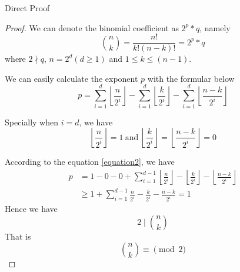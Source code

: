 \item Direct Proof
\begin{proof}
We can denote the binomial coefficient as $2^p * q$, namely
\begin{equation}\label{equation2}
\binom{n}{k} = \frac{n!}{k!(n - k)!} = 2^p * q
\end{equation}
where $2 \nmid q$, $n = 2^d(d \geq 1)$ and $1\leq k\leq (n - 1)$.

We can easily calculate the exponent $p$ with the formular below
\begin{displaymath}
p = \sum_{i = 1}^{d}\left\lfloor \frac{n}{2^i} \right\rfloor - \sum_{i = 1}^{d}\left\lfloor \frac{k}{2^i}\right\rfloor - \sum_{i = 1}^{d}\left\lfloor \frac{n - k}{2^i}\right\rfloor
\end{displaymath}

Specially when $i = d$, we have
\begin{displaymath}
\left\lfloor \frac{n}{2^i} \right\rfloor = 1~\text{and}~\left\lfloor \frac{k}{2^i}\right\rfloor = \left\lfloor \frac{n - k}{2^i}\right\rfloor = 0
\end{displaymath}

According to the equation \eqref{equation2}, we have
\begin{displaymath}
	\begin{split}
		p &= 1 - 0 - 0 + \sum_{i = 1}^{d - 1} \left\lfloor \frac{n}{2^i}\right\rfloor - \left\lfloor \frac{k}{2^i}\right\rfloor - \left\lfloor \frac{n - k}{2^i}\right\rfloor\\
		&\geq 1  + \sum_{i = 1}^{d - 1} \frac{n}{2^i} - \frac{k}{2^i} - \frac{n - k}{2^i} = 1
	\end{split}
\end{displaymath}
Hence we have
\[2 \mid \binom{n}{k}\]
That is
\[\binom{n}{k} \equiv \pmod{2}\]
\end{proof}
